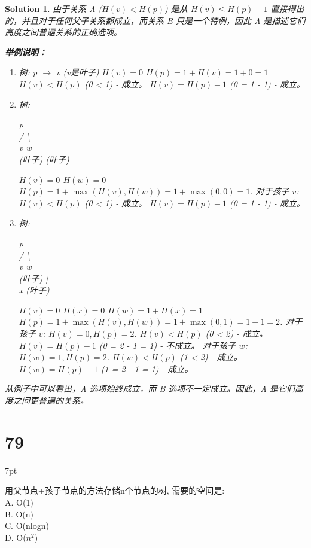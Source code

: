 \documentclass[UTF8]{report}
\newtheorem{solution}{Solution}
\theoremstyle{MyLineTheoremStyle} %
\theoremstyle{MyBlockTheoremStyle} %
\theoremstyle{MySubsubsectionStyle} %
\newenvironment{graybox}{%
        \def\FrameCommand{%
        \hspace{1pt}%
        {\color{gray}\small \vrule width 2pt}%
        {\color{graybox_color}\vrule width 4pt}%
        \colorbox{graybox_color}%
        }%
        \MakeFramed{\advance\hsize-\width\FrameRestore}%
        \noindent\hspace{-4.55pt}%
        \begin{adjustwidth}{}{7pt}%
        \vspace{2pt}\vspace{2pt}%
        }
        {%
        \vspace{2pt}\end{adjustwidth}\endMakeFramed%
        }
\begin{document}
\begin{solution}
由于关系 A ($H(v) < H(p)$) 是从 $H(v) \le H(p) - 1$ 直接得出的，并且对于任何父子关系都成立，而关系 B 只是一个特例，因此 A 是描述它们高度之间普遍关系的正确选项。

\textbf{举例说明：}
\begin{enumerate}
    \item 树: p $\rightarrow$ v (v是叶子)
        $H(v) = 0$
        $H(p) = 1 + H(v) = 1 + 0 = 1$
        $H(v) < H(p)$ (0 < 1) - 成立。
        $H(v) = H(p) - 1$ (0 = 1 - 1) - 成立。

    \item 树:
        \begin{center}
        p \\
        / \textbackslash \\
        v   w \\
        (叶子) (叶子)
        \end{center}
        $H(v) = 0$
        $H(w) = 0$
        $H(p) = 1 + \max(H(v), H(w)) = 1 + \max(0, 0) = 1$.
        对于孩子 $v$: $H(v) < H(p)$ (0 < 1) - 成立。 $H(v) = H(p) - 1$ (0 = 1 - 1) - 成立。

    \item 树:
        \begin{center}
        p \\
        / \textbackslash \\
        v   w \\
        (叶子) | \\
              x (叶子)
        \end{center}
        $H(v) = 0$
        $H(x) = 0$
        $H(w) = 1 + H(x) = 1$
        $H(p) = 1 + \max(H(v), H(w)) = 1 + \max(0, 1) = 1 + 1 = 2$.
        对于孩子 $v$:
        $H(v) = 0, H(p) = 2$.
        $H(v) < H(p)$ (0 < 2) - 成立。
        $H(v) = H(p) - 1$ (0 = 2 - 1 = 1) - 不成立。
        对于孩子 $w$:
        $H(w) = 1, H(p) = 2$.
        $H(w) < H(p)$ (1 < 2) - 成立。
        $H(w) = H(p) - 1$ (1 = 2 - 1 = 1) - 成立。
\end{enumerate}
从例子中可以看出，A 选项始终成立，而 B 选项不一定成立。因此，A 是它们高度之间更普遍的关系。
\end{solution}

\section*{79}
\begin{graybox}
用父节点+孩子节点的方法存储n个节点的树,
需要的空间是: \\
A. O(1) \\
B. O(n) \\
C. O(nlogn) \\
D. O($n^2$)
\end{graybox}
\end{document}
